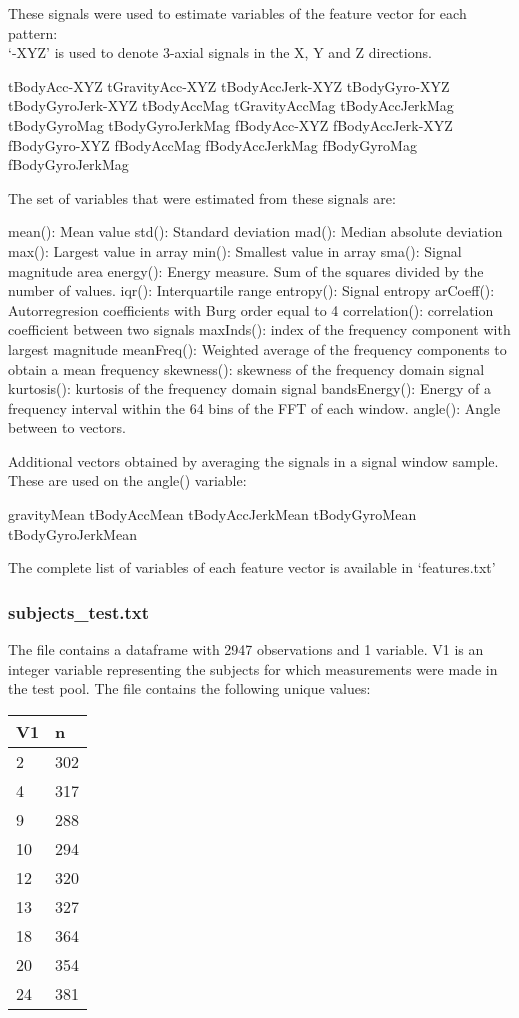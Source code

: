 \documentclass[
]{article}
\begin{document}
These signals were used to estimate variables of the feature vector for
each pattern:\\
`-XYZ' is used to denote 3-axial signals in the X, Y and Z directions.

tBodyAcc-XYZ tGravityAcc-XYZ tBodyAccJerk-XYZ tBodyGyro-XYZ
tBodyGyroJerk-XYZ tBodyAccMag tGravityAccMag tBodyAccJerkMag
tBodyGyroMag tBodyGyroJerkMag fBodyAcc-XYZ fBodyAccJerk-XYZ
fBodyGyro-XYZ fBodyAccMag fBodyAccJerkMag fBodyGyroMag fBodyGyroJerkMag

The set of variables that were estimated from these signals are:

mean(): Mean value std(): Standard deviation mad(): Median absolute
deviation max(): Largest value in array min(): Smallest value in array
sma(): Signal magnitude area energy(): Energy measure. Sum of the
squares divided by the number of values. iqr(): Interquartile range
entropy(): Signal entropy arCoeff(): Autorregresion coefficients with
Burg order equal to 4 correlation(): correlation coefficient between two
signals maxInds(): index of the frequency component with largest
magnitude meanFreq(): Weighted average of the frequency components to
obtain a mean frequency skewness(): skewness of the frequency domain
signal kurtosis(): kurtosis of the frequency domain signal
bandsEnergy(): Energy of a frequency interval within the 64 bins of the
FFT of each window. angle(): Angle between to vectors.

Additional vectors obtained by averaging the signals in a signal window
sample. These are used on the angle() variable:

gravityMean tBodyAccMean tBodyAccJerkMean tBodyGyroMean
tBodyGyroJerkMean

The complete list of variables of each feature vector is available in
`features.txt'

\hypertarget{subjects_test.txt}{%
\subsubsection{subjects\_test.txt}\label{subjects_test.txt}}

The file contains a dataframe with 2947 observations and 1 variable. V1
is an integer variable representing the subjects for which measurements
were made in the test pool. The file contains the following unique
values:

\begin{longtable}[]{@{}ll@{}}
\toprule()
V1 & n \\
\midrule()
\endhead
2 & 302 \\
4 & 317 \\
9 & 288 \\
10 & 294 \\
12 & 320 \\
13 & 327 \\
18 & 364 \\
20 & 354 \\
24 & 381 \\
\bottomrule()
\end{longtable}
\end{document}
